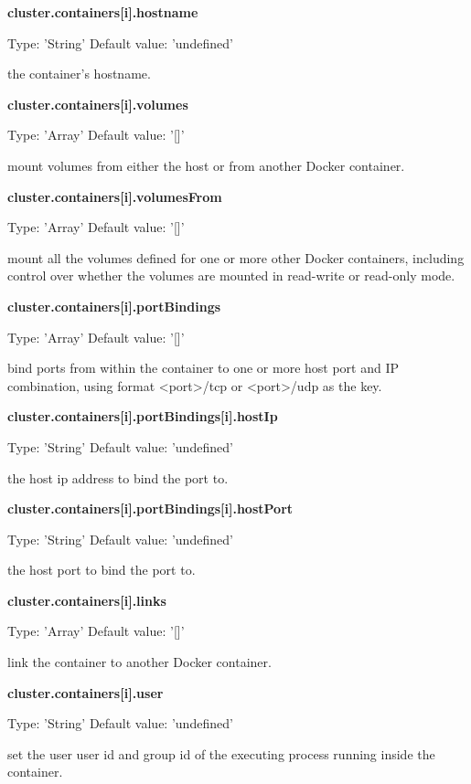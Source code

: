 \documentclass[a4paper,11pt,twoside]{report}
\begin{document}
\begin{appendices}
\noindent
\textbf{cluster.containers[i].hostname}

\noindent
Type: 'String' Default value: 'undefined'\smallskip

\noindent 
the container's hostname.\bigskip

\noindent
\textbf{cluster.containers[i].volumes}

\noindent
Type: 'Array' Default value: '[]'\smallskip

\noindent 
mount volumes from either the host or from another Docker container.\bigskip

\noindent
\textbf{cluster.containers[i].volumesFrom}

\noindent
Type: 'Array' Default value: '[]'\smallskip

\noindent 
mount all the volumes defined for one or more other Docker containers, including control over whether the volumes are mounted in read-write or read-only mode.\bigskip

\noindent
\textbf{cluster.containers[i].portBindings}

\noindent
Type: 'Array' Default value: '[]'\smallskip

\noindent 
bind ports from within the container to one or more host port and IP combination, using format <port>/tcp or <port>/udp as the key.\bigskip

\noindent
\textbf{cluster.containers[i].portBindings[i].hostIp}

\noindent
Type: 'String' Default value: 'undefined'\smallskip

\noindent 
the host ip address to bind the port to.\bigskip

\noindent
\textbf{cluster.containers[i].portBindings[i].hostPort}

\noindent
Type: 'String' Default value: 'undefined'\smallskip

\noindent 
the host port to bind the port to.\bigskip

\noindent
\textbf{cluster.containers[i].links}

\noindent
Type: 'Array' Default value: '[]'\smallskip

\noindent 
link the container to another Docker container.\bigskip

\noindent
\textbf{cluster.containers[i].user}

\noindent
Type: 'String' Default value: 'undefined'\smallskip

\noindent 
set the user user id and group id of the executing process running inside the container.\bigskip


\end{appendices}
\end{document}
